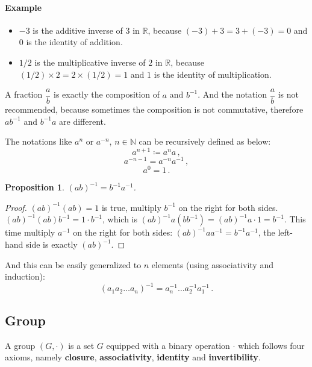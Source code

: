 \documentclass[UTF8]{ctexart}
\theoremstyle{mystyle}
\newtheorem{proposition}{Proposition}[section]
\theoremstyle{myremark}
\theoremstyle{plain}
\newcommand{\R}{\mathbb R}
\newcommand{\N}{\mathbb N}
\begin{document}
\paragraph{Example}
\begin{itemize}
    \item $ -3 $ is the additive inverse of $ 3 $ in $ \R $, because $ (-3) + 3 = 3 + (-3) = 0 $ and $ 0 $ is the identity of addition.
    \item $ 1/2 $ is the multiplicative inverse of $ 2 $ in $ \R $, because $ (1/2) \times 2 = 2 \times (1/2) = 1 $ and $ 1 $ is the identity of multiplication.
\end{itemize}

A fraction $ \dfrac{a}{b} $ is exactly the composition of $ a $ and $ b^{-1} $. And the notation $ \dfrac{a}{b} $ is not recommended, because sometimes the composition is not commutative, therefore $ a b^{-1} $ and $ b^{-1} a $ are different.

The notations like $ a^n $ or $ a^{-n} $, $ n \in \N $ can be recursively defined as below:
\[ a^{n + 1} \coloneqq a^n a  \,,\]
\[ a^{-n - 1} = a^{-n} a^{-1} \,,\] 
\[ a^0 = 1 \,.\]

\begin{proposition}
    $ (a b)^{-1} = b^{-1} a^{-1} $.
\end{proposition}

\begin{proof}
    $ (ab)^{-1} (ab) = 1 $ is true, multiply $ b^{-1} $ on the right for both sides. $ (a b)^{-1} (a b) b^{-1} = 1 \cdot b^{-1} $, which is $ (a b)^{-1} a (b b^{-1}) = (a b)^{-1} a \cdot 1 = b^{-1} $. This time multiply $ a^{-1} $ on the right for both sides: $ (a b)^{-1} a a^{-1} = b^{-1} a^{-1} $, the left-hand side is exactly $ (a b)^{-1} $.
\end{proof}

And this can be easily generalized to $ n $ elements (using associativity and induction):
\[ (a_1 a_2 \dots a_n)^{-1} = a_n^{-1} \dots a_2^{-1} a_1^{-1} \,.\]

\subsection{Group}
\begin{definition}
    A group $ (G, \cdot) $ is a set $ G $ equipped with a binary operation $ \cdot $ which follows four axioms, namely \textbf{closure}, \textbf{associativity}, \textbf{identity} and \textbf{invertibility}.
\end{definition}    
\end{document}
